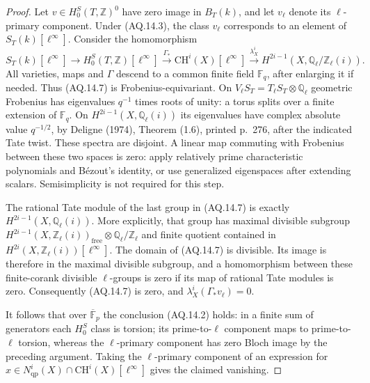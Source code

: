 \begin{proof}
Let $v\in H_0^S(T,\mathbb Z)^0$ have zero image in $B_T(k)$,
and let $v_\ell$ denote its $\ell$-primary component.
Under (AQ.14.3), the class $v_\ell$ corresponds to an
element of $S_T(k)[\ell^\infty]$. Consider the homomorphism
\[
 S_T(k)[\ell^\infty]\longrightarrow
 H_0^S(T,\mathbb Z)[\ell^\infty]
 \xrightarrow{\Gamma_*}\mathrm{CH}^i(X)[\ell^\infty]
 \xrightarrow{\lambda_X^i}
 H^{2i-1}(X,\mathbb Q_\ell/\mathbb Z_\ell(i)).                \tag{AQ.14.7}
\]
All varieties, maps and $\Gamma$ descend to a common finite
field $\mathbb F_q$, after enlarging it if needed. Thus
(AQ.14.7) is Frobenius-equivariant. On
$V_\ell S_T=T_\ell S_T\otimes\mathbb Q_\ell$ geometric
Frobenius has eigenvalues $q^{-1}$ times roots of unity:
a torus splits over a finite extension of $\mathbb F_q$.
On
$H^{2i-1}(X,\mathbb Q_\ell(i))$ its eigenvalues have
complex absolute value $q^{-1/2}$, by Deligne (1974),
Theorem (1.6), printed p.~276, after the indicated Tate
twist. These spectra are disjoint. A linear map
commuting with Frobenius between these two spaces is zero:
apply relatively prime characteristic polynomials and
B\'ezout's identity, or use generalized eigenspaces
after extending scalars. Semisimplicity is not
required for this step.

The rational Tate module of the last group in (AQ.14.7)
is exactly $H^{2i-1}(X,\mathbb Q_\ell(i))$. More explicitly,
that group has maximal divisible subgroup
$H^{2i-1}(X,\mathbb Z_\ell(i))_{\mathrm{free}}
 \otimes\mathbb Q_\ell/\mathbb Z_\ell$ and finite quotient
contained in $H^{2i}(X,\mathbb Z_\ell(i))[\ell^\infty]$.
The domain of (AQ.14.7) is divisible. Its image is therefore
in the maximal divisible subgroup, and a homomorphism
between these finite-corank divisible $\ell$-groups is
zero if its map of rational Tate modules is zero.
Consequently (AQ.14.7) is zero, and
$\lambda_X^i(\Gamma_*v_\ell)=0$.

It follows that over $\overline{\mathbb F}_p$ the conclusion
(AQ.14.2) holds: in a finite sum of generators each
$H_0^S$ class is torsion; its prime-to-$\ell$ component
maps to prime-to-$\ell$ torsion, whereas the $\ell$-primary
component has zero Bloch image by the preceding argument.
Taking the $\ell$-primary component of an expression for
$x\in N^i_{\mathrm{qp}}(X)\cap\mathrm{CH}^i(X)[\ell^\infty]$
gives the claimed vanishing.


\end{proof}
